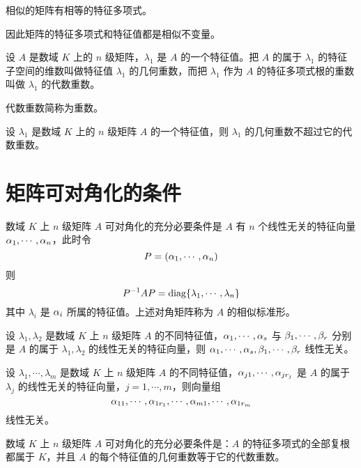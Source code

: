 \begin{theorem}
    相似的矩阵有相等的特征多项式。
\end{theorem}

因此矩阵的特征多项式和特征值都是相似不变量。

\begin{definition}
    设 $A$ 是数域 $K$ 上的 $n$ 级矩阵，$\lambda_1$ 是 $A$ 的一个特征值。把 $A$ 的属于 $\lambda_1$ 的特征子空间的维数叫做特征值 $\lambda_1$ 的几何重数，而把 $\lambda_1$ 作为 $A$ 的特征多项式根的重数叫做 $\lambda_1$ 的代数重数。
\end{definition}

代数重数简称为重数。

\begin{theorem}
    设 $\lambda_1$ 是数域 $K$ 上的 $n$ 级矩阵 $A$ 的一个特征值，则 $\lambda_1$ 的几何重数不超过它的代数重数。
\end{theorem}

\section{矩阵可对角化的条件}

\begin{theorem}
    数域 $K$ 上 $n$ 级矩阵 $A$ 可对角化的充分必要条件是 $A$ 有 $n$ 个线性无关的特征向量 $\alpha_1,\cdots,\alpha_n$，此时令
    \[P=(\alpha_1,\cdots,\alpha_n)\]
    则
    \[P^{-1}AP = \operatorname{diag}\{\lambda_1,\cdots,\lambda_n\}\]
    其中 $\lambda_i$ 是 $\alpha_i$ 所属的特征值。上述对角矩阵称为 $A$ 的相似标准形。
\end{theorem}

\begin{theorem}
    设 $\lambda_1,\lambda_2$ 是数域 $K$ 上 $n$ 级矩阵 $A$ 的不同特征值，$\alpha_1,\cdots,\alpha_s$ 与 $\beta_1,\cdots,\beta_r$ 分别是 $A$ 的属于 $\lambda_1,\lambda_2$ 的线性无关的特征向量，则 $\alpha_1,\cdots,\alpha_s,\beta_1,\cdots,\beta_r$ 线性无关。
\end{theorem}

\begin{theorem}
    设 $\lambda_1,\cdots,\lambda_m$ 是数域 $K$ 上 $n$ 级矩阵 $A$ 的不同特征值，$\alpha_{j1},\cdots,\alpha_{jr_j}$ 是 $A$ 的属于 $\lambda_j$ 的线性无关的特征向量，$j=1,\cdots,m$，则向量组
    \[\alpha_{11},\cdots,\alpha_{1r_1},\cdots,\alpha_{m1},\cdots,\alpha_{1r_m}\]
    线性无关。
\end{theorem}

\begin{theorem}
    数域 $K$ 上 $n$ 级矩阵 $A$ 可对角化的充分必要条件是：$A$ 的特征多项式的全部复根都属于 $K$，并且 $A$ 的每个特征值的几何重数等于它的代数重数。
\end{theorem}

